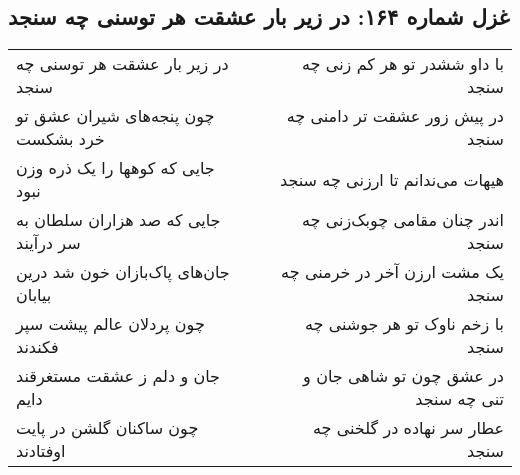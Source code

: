 \begin{center}
\section*{غزل شماره ۱۶۴: در زیر بار عشقت هر توسنی چه سنجد}
\label{sec:164}
\begin{longtable}{l p{0.5cm} r}
در زیر بار عشقت هر توسنی چه سنجد
&&
با داو ششدر تو هر کم زنی چه سنجد
\\
چون پنجه‌های شیران عشق تو خرد بشکست
&&
در پیش زور عشقت تر دامنی چه سنجد
\\
جایی که کوهها را یک ذره وزن نبود
&&
هیهات می‌ندانم تا ارزنی چه سنجد
\\
جایی که صد هزاران سلطان به سر درآیند
&&
اندر چنان مقامی چوبک‌زنی چه سنجد
\\
جان‌های پاک‌بازان خون شد درین بیابان
&&
یک مشت ارزن آخر در خرمنی چه سنجد
\\
چون پردلان عالم پیشت سپر فکندند
&&
با زخم ناوک تو هر جوشنی چه سنجد
\\
جان و دلم ز عشقت مستغرقند دایم
&&
در عشق چون تو شاهی جان و تنی چه سنجد
\\
چون ساکنان گلشن در پایت اوفتادند
&&
عطار سر نهاده در گلخنی چه سنجد
\\
\end{longtable}
\end{center}
